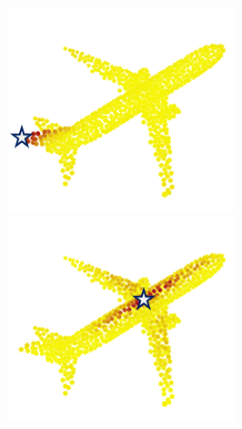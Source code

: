 \documentclass[letterpaper]{article} %
\begin{document}
\begin{figure}[htbp]
\begin{center}
\begin{minipage}[b]{0.8\linewidth}
\begin{center}
\begin{minipage}[b]{0.12\linewidth}
\begin{center}
\includegraphics[width=1.0\linewidth]{images/atten_pic/airplane_feature_1.png}
\end{center}
\end{minipage}
\begin{minipage}[b]{0.12\linewidth}
\begin{center}
\includegraphics[width=1.0\linewidth]{images/atten_pic/airplane_feature_2.png}
\end{center}

\end{minipage}
\end{center}
\end{minipage}
\end{center}
\end{figure}
\end{document}
